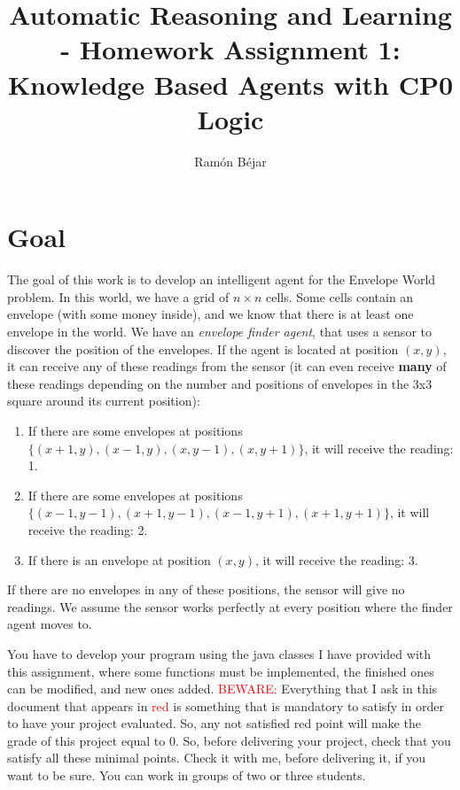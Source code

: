 \documentclass{tufte-handout}
\title[HW 1: Knowledge Based Agents]{Automatic Reasoning and Learning \\-
Homework Assignment 1: Knowledge Based Agents with  CP0 Logic}
\author[ramon]{Ram\'on B\'ejar}
\begin{document}
\maketitle

\section{Goal}

\begin{fullwidth}
The goal of this work is to develop an intelligent agent for
the Envelope World problem. In this world, we have a grid of
$n \times n$ cells. Some cells contain an envelope (with some money inside),
 and we know that  there is at least one envelope in the world.
We have an {\it envelope finder agent}, that uses a sensor to discover the position
of the envelopes.  If the agent is located at position $(x,y)$, it can receive
any of these readings from the sensor (it can even receive {\bf many} of these readings
depending on the number and positions of envelopes in the 3x3 square around its
 current position):
\begin{enumerate}
\item If there are some envelopes at positions $\{(x+1,y),(x-1,y),(x,y-1),(x,y+1) \} $,
it will receive the reading: 1.
\item  If there are some envelopes at positions $\{(x-1,y-1),(x+1,y-1),(x-1,y+1),(x+1,y+1) \} $,
it will receive the reading: 2.
\item  If there is an envelope at position $(x,y)$, it will receive the reading: 3.
\end{enumerate}
If there are no envelopes in any of these positions, the sensor will give no readings.
We assume the sensor works perfectly at every position where the finder agent moves to.

You have to develop your program using the java classes I have provided
with this assignment, where some functions must be implemented, the
finished ones can be modified, and new ones added.
\textcolor{red}{BEWARE:} Everything that I ask in this document that appears in
\textcolor{red}{red} is something that is mandatory to satisfy in order to have
your project evaluated. So, any not satisfied  red point will make the grade of this
project equal to 0. So, before delivering your project, check that you satisfy all these
minimal points. Check it with me, before delivering it, if you want to be sure.
You can work in groups of two or three students.


\end{fullwidth}
\end{document}
